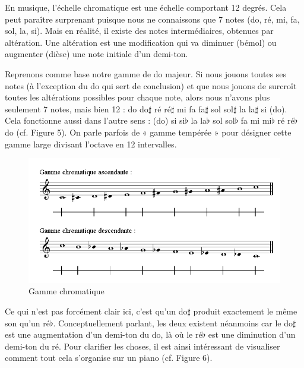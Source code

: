 \documentclass[a4paper,12pt]{article}
\begin{document}
En musique, l'échelle chromatique est une échelle comportant 12 degrés. Cela peut paraître surprenant puisque nous ne connaissons que 7 notes (do, ré, mi, fa, sol, la, si). Mais en réalité, il existe des notes intermédiaires, obtenues par altération. Une altération est une modification qui va diminuer (bémol) ou augmenter (dièse) une note initiale d'un demi-ton.

Reprenons comme base notre gamme de do majeur. Si nous jouons toutes ses notes (à l'exception du do qui sert de conclusion) et que nous jouons de surcroît toutes les altérations possibles pour chaque note, alors nous n'avons plus seulement 7 notes, mais bien 12 : do do$\sharp$ ré ré$\sharp$ mi fa fa$\sharp$ sol sol$\sharp$ la la$\sharp$ si (do). Cela fonctionne aussi dans l'autre sens : (do) si si$\flat$ la la$\flat$ sol sol$\flat$ fa mi mi$\flat$ ré ré$\flat$ do (cf. Figure 5). On parle parfois de « gamme tempérée » pour désigner cette gamme large divisant l'octave en 12 intervalles.

\begin{figure}[h]
  \begin{center}
    \includegraphics[scale=0.5]{gamme-chromatique.png}
    \caption{Gamme chromatique}
  \end{center}
\end{figure}

Ce qui n'est pas forcément clair ici, c'est qu'un do$\sharp$ produit exactement le même son qu'un ré$\flat$. Conceptuellement parlant, les deux existent néanmoins car le do$\sharp$ est une augmentation d'un demi-ton du do, là où le ré$\flat$ est une diminution d'un demi-ton du ré. Pour clarifier les choses, il est ainsi intéressant de visualiser comment tout cela s'organise sur un piano (cf. Figure 6).
\end{document}
